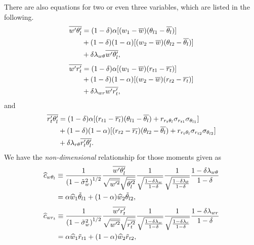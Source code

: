 There are also equations for two or even three variables, which are listed in the following.
\begin{align}
    \label{eq:w_prime_theta_l_prime_bar}
    \overline{w' \theta_l'}
    &= (1 - \delta) \alpha [(w_1 - \overline{w}) (\theta_{l1} - \overline{\theta_l})] \nonumber\\
    &+ (1 - \delta) (1 - \alpha) [(w_2 - \overline{w}) (\theta_{l2} - \overline{\theta_l})] \nonumber\\
    &+ \delta \lambda_{w\theta} \overline{w' \theta_l'},
\end{align}
\begin{align}
    \label{eq:w_prime_r_t_prime_bar}
    \overline{w' r_t'}
    &= (1 - \delta) \alpha [(w_1 - \overline{w}) (r_{t1} - \overline{r_t})] \nonumber\\
    &+ (1 - \delta) (1 - \alpha) [(w_2 - \overline{w}) (r_{t2} - \overline{r_t})] \nonumber\\
    &+ \delta \lambda_{wr} \overline{w' r_t'},
\end{align}
and
\begin{align}
    \label{eq:r_t_prime_theta_l_prime_bar}
    \overline{r_t' \theta_l'}
    &= (1 - \delta) \alpha [(r_{t1} - \overline{r_t}) (\theta_{l1} - \overline{\theta_l}) + r_{r_t \theta_l} \sigma_{r_{t1}} \sigma_{\theta_{l1}}] \nonumber\\
    &+ (1 - \delta) (1 - \alpha) [(r_{t2} - \overline{r_t}) (\theta_{l2} - \overline{\theta_l}) + r_{r_t \theta_l} \sigma_{r_{t2}} \sigma_{\theta_{l2}}] \nonumber\\
    &+ \delta \lambda_{r\theta} \overline{r_t' \theta_l'}.
\end{align}
We have the \emph{non-dimensional} relationship for those moments given as
\begin{align}
    \widehat{c}_{w \theta_l}
    &\equiv \frac{1}{\left( 1 - \tilde{\sigma}_w^2 \right)^{1/2}} \frac{\overline{w' \theta_l'}}{\sqrt{\overline{w'^2}}\sqrt{\overline{\theta_l'^2}}} \frac{1}{\sqrt{\frac{1 - \delta \lambda_w}{1 - \delta}}}\frac{1}{\sqrt{\frac{1 - \delta \lambda_\theta}{1 - \delta}}} \frac{1 - \delta \lambda_{w\theta}}{1 - \delta} \nonumber\\
    &= \alpha \widehat{w}_1 \tilde{\theta}_{l1} + (1 - \alpha) \widehat{w}_2 \tilde{\theta}_{l2},
    \label{eq:c_hat_w_theta_l_nondim}
\end{align}
\begin{align}
    \widehat{c}_{w r_t}
    &\equiv \frac{1}{\left( 1 - \tilde{\sigma}_w^2 \right)^{1/2}} \frac{\overline{w' r_t'}}{\sqrt{\overline{w'^2}}\sqrt{\overline{r_t'^2}}} \frac{1}{\sqrt{\frac{1 - \delta \lambda_w}{1 - \delta}}} \frac{1}{\sqrt{\frac{1 - \delta \lambda_r}{1-\delta}}} \frac{1 - \delta \lambda_{w r}}{1-\delta} \nonumber\\
    &= \alpha \widehat{w}_1 \tilde{r}_{t1} + (1 - \alpha) \widehat{w}_2 \tilde{r}_{t2},
    \label{eq:c_hat_w_r_t_nondim}
\end{align}
